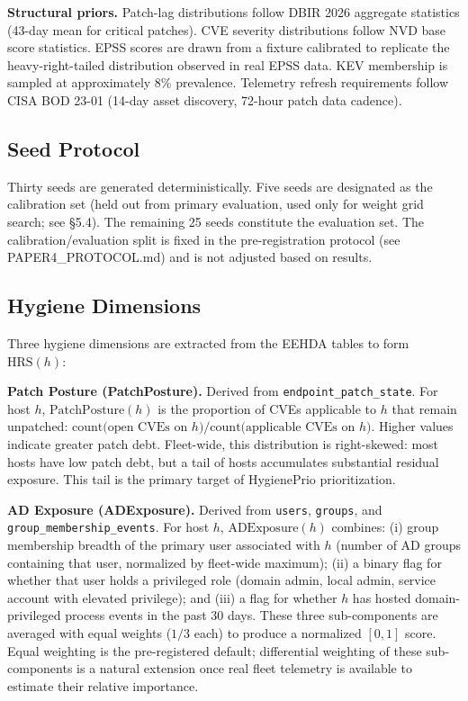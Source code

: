 \textbf{Structural priors.} Patch-lag distributions follow DBIR 2026 aggregate statistics (43-day mean for critical patches). CVE severity distributions follow NVD base score statistics. EPSS scores are drawn from a fixture calibrated to replicate the heavy-right-tailed distribution observed in real EPSS data. KEV membership is sampled at approximately 8\% prevalence. Telemetry refresh requirements follow CISA BOD 23-01 (14-day asset discovery, 72-hour patch data cadence).

\subsection{Seed Protocol}

Thirty seeds are generated deterministically. Five seeds are designated as the calibration set (held out from primary evaluation, used only for weight grid search; see \S5.4). The remaining 25 seeds constitute the evaluation set. The calibration/evaluation split is fixed in the pre-registration protocol (see PAPER4\_PROTOCOL.md) and is not adjusted based on results.

\subsection{Hygiene Dimensions}

Three hygiene dimensions are extracted from the EEHDA tables to form $\mathrm{HRS}(h)$:

\textbf{Patch Posture (PatchPosture).} Derived from \texttt{endpoint\_patch\_state}. For host $h$, $\mathrm{PatchPosture}(h)$ is the proportion of CVEs applicable to $h$ that remain unpatched: $\text{count(open CVEs on }h) / \text{count(applicable CVEs on }h)$. Higher values indicate greater patch debt. Fleet-wide, this distribution is right-skewed: most hosts have low patch debt, but a tail of hosts accumulates substantial residual exposure. This tail is the primary target of HygienePrio prioritization.

\textbf{AD Exposure (ADExposure).} Derived from \texttt{users}, \texttt{groups}, and \texttt{group\_membership\_events}. For host $h$, $\mathrm{ADExposure}(h)$ combines: (i) group membership breadth of the primary user associated with $h$ (number of AD groups containing that user, normalized by fleet-wide maximum); (ii) a binary flag for whether that user holds a privileged role (domain admin, local admin, service account with elevated privilege); and (iii) a flag for whether $h$ has hosted domain-privileged process events in the past 30 days. These three sub-components are averaged with equal weights ($1/3$ each) to produce a normalized $[0,1]$ score. Equal weighting is the pre-registered default; differential weighting of these sub-components is a natural extension once real fleet telemetry is available to estimate their relative importance.

